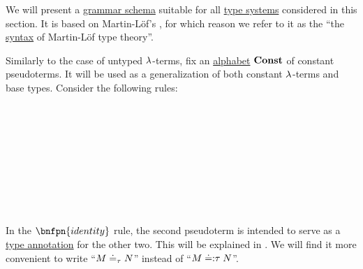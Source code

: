 \begin{definition}\label{def:mltt_pseudoterm}\mimprovised
  We will present a \hyperref[def:formal_grammar/schema]{grammar schema} suitable for all \hyperref[def:abstract_type_system]{type systems} considered in this section. It is based on Martin-L\"of's \cite{MartinLöf1984IntuitionisticTypeTheory}, for which reason we refer to it as the \enquote{the \hyperref[con:syntax_semantics_duality]{syntax} of Martin-L\"of type theory}.

  Similarly to the case of untyped \( {\mathrm \lambda} \)-terms, fix an \hyperref[def:formal_language/alphabet]{alphabet} \( \op*{Const} \) of constant pseudoterms. It will be used as a generalization of both constant \( {\mathrm \lambda} \)-terms and base types. Consider the following rules:

  \begin{bnf*}
               {} \\
                   { \bnfor {}} \\
     { \bnfsp \bnftsq{:} \bnfsp {}} \\
            {\bnftsq{\( ( \)} \bnfsp {} \bnfsp {} \bnfsp \bnftsq{\( ) \)}} \\
                 {\bnftsq{\( \synlambda \)} \bnfor \bnftsq{\( \synprod \)} \bnfor \bnftsq{\( \synsum \)}} \\
      {\bnftsq{\( ( \)} \bnfsp {} \bnfsp {} \bnfsp {} \bnfsp {} \bnfsp \bnftsq{\( ) \)}} \\
               {\bnftsq{\( ( \)} \bnfsp {} \bnfsp \bnftsq{\( \syneq \)} \bnfsp \bnftsq{\( : \)} \bnfsp {} \bnfsp {} \bnfsp \bnftsq{\( ) \)}} \\
             { \bnfor {}\bnfor {} \bnfor {} \bnfor} \\
  \end{bnf*}

  In the \( \bnfpn{identity} \) rule, the second pseudoterm is intended to serve as a \hyperref[con:type_annotation]{type annotation} for the other two. This will be explained in . We will find it more convenient to write \enquote{\( M \doteq_\tau N \)} instead of \enquote{\( M \mathrel{{\doteq:} \tau} N \)}.


\end{definition}
